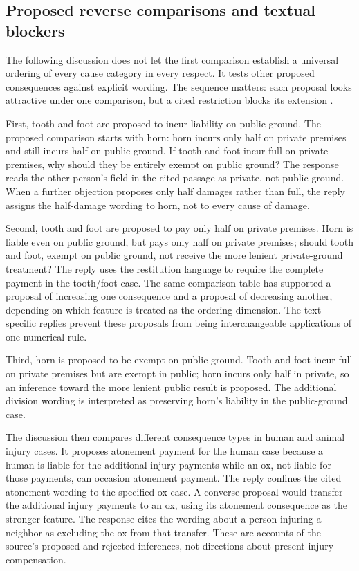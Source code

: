 \subsection{Proposed reverse comparisons and textual blockers}
\label{sec:p18-talmudic-blocked-comparisons}

The following discussion does not let the first comparison establish
a universal ordering of every cause category in every respect.
It tests other proposed consequences against explicit wording. The
sequence matters: each proposal looks attractive under one comparison,
but a cited restriction blocks its extension
\parencite[pp.~52--53]{RodkinsonBabaKamaCopyright1900}.

First, tooth and foot are proposed to incur liability on public
ground. The proposed comparison starts with horn: horn incurs only
half on private premises and still incurs half on public ground.
If tooth and foot incur full on private premises, why should they
be entirely exempt on public ground? The response reads the
other person's field in the cited passage as private, not public
ground. When a further objection proposes only half damages rather
than full, the reply assigns the half-damage wording to horn,
not to every cause of damage.

Second, tooth and foot are proposed to pay only half on private
premises. Horn is liable even on public ground, but pays only half
on private premises; should tooth and foot, exempt on public ground,
not receive the more lenient private-ground treatment? The reply
uses the restitution language to require the complete payment in
the tooth/foot case. The same comparison table has supported a
proposal of increasing one consequence and a proposal of decreasing
another, depending on which feature is treated as the ordering
dimension. The text-specific replies prevent these proposals from
being interchangeable applications of one numerical rule.

Third, horn is proposed to be exempt on public ground. Tooth and
foot incur full on private premises but are exempt in public;
horn incurs only half in private, so an inference toward the
more lenient public result is proposed. The additional division
wording is interpreted as preserving horn's liability in the
public-ground case.

The discussion then compares different consequence types in human
and animal injury cases. It proposes atonement payment for the
human case because a human is liable for the additional injury
payments while an ox, not liable for those payments, can occasion
atonement payment. The reply confines the cited atonement wording
to the specified ox case. A converse proposal would transfer the
additional injury payments to an ox, using its atonement consequence
as the stronger feature. The response cites the wording about a
person injuring a neighbor as excluding the ox from that transfer.
These are accounts of the source's proposed and rejected inferences,
not directions about present injury compensation.

